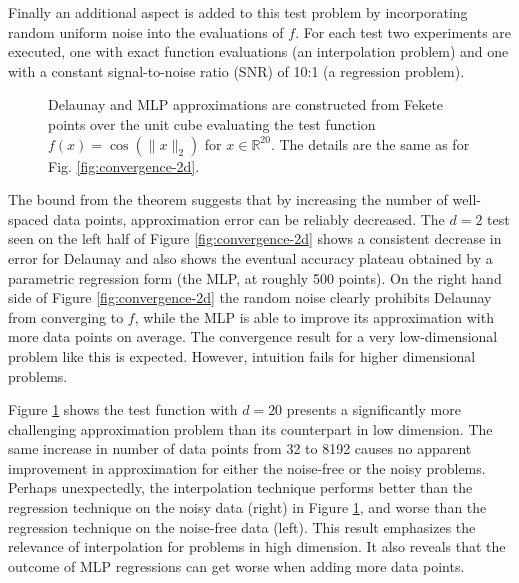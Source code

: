 Finally an additional aspect is added to this test problem by
incorporating random uniform noise into the evaluations of $f.$ For
each test two experiments are executed, one with exact function
evaluations (an interpolation problem) and one with a
constant signal-to-noise ratio (SNR) of 10:1 (a regression
  problem).

\begin{figure}
  \centering
  \caption{Delaunay and MLP approximations are constructed from Fekete
    points over the unit cube evaluating the test function $f(x) =
    \cos(\|x\|_2)$ for $x \in \mathbb{R}^{20}$. The details are the
    same as for Fig. \ref{fig:convergence-2d}.}
  \label{fig:convergence-20d}
\end{figure}


The bound from the theorem suggests that by increasing the number of
well-spaced data points, approximation error can be reliably
decreased. The $d = 2$ test seen on the left half of Figure
\ref{fig:convergence-2d} shows a consistent decrease in error for
Delaunay and also shows the eventual accuracy plateau obtained by a
parametric regression form (the MLP, at roughly 500 points). On the
right hand side of Figure \ref{fig:convergence-2d} the random noise
clearly prohibits Delaunay from converging to $f$, while the MLP is
able to improve its approximation with more data points on average.
The convergence result for a very low-dimensional problem like this is
expected.  However, intuition fails for higher dimensional problems.

Figure \ref{fig:convergence-20d} shows the test function with $d = 20$
presents a significantly more challenging approximation problem than
its counterpart in low dimension. The same increase in number of data
points from 32 to 8192 causes no apparent improvement in approximation
for either the noise-free or the noisy problems. Perhaps unexpectedly,
the interpolation technique performs better than the regression
technique on the noisy data (right) in Figure
\ref{fig:convergence-20d}, and worse than the regression technique on
the noise-free data (left). This result emphasizes the relevance of
interpolation for problems in high dimension. It also reveals that the
outcome of MLP regressions can get worse when adding more data points.

